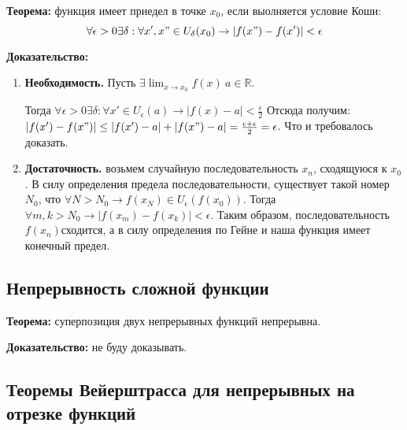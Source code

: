 \documentclass{article}
\begin{document}
\textbf{Теорема:} функция имеет приедел в точке $x_0$, если выолняется условие Коши:
\begin{equation}
    \forall\epsilon>0\exists\delta:\forall x',x" \in U_{\delta}(x_0) \rightarrow |f(x") - f(x')| < \epsilon
\end{equation}

\textbf{Доказательство:}
\begin{enumerate}
    \item \textbf{Необходимость.} Пусть $\exists\lim_{x\rightarrow x_0} f(x) \ a\in\mathbb{R}$.
    
    Тогда $\forall\epsilon>0\exists\delta:\forall x'\in U_{\epsilon}(a) \rightarrow |f(x) - a| < \frac{\epsilon}{2}$
    Отсюда получим: $|f(x') - f(x")| \leq |f(x')-a|+|f(x")-a| = \frac{\epsilon + \epsilon}{2} = \epsilon$.
    Что и требовалось доказать.
    
    \item \textbf{Достаточность.} возьмем случайную последовательность $x_n$, сходящуюся к $x_0$. В силу определения предела последовательности, существует такой номер $N_0$, что $\forall N > N_0 \rightarrow f(x_N)\in U_{\epsilon}(f(x_0))$. Тогда $\forall m, k > N_0 \rightarrow |f(x_m) - f(x_k)| < \epsilon$. Таким образом, последовательность $f(x_n)$сходится, а в силу определения по Гейне и наша функция имеет конечный предел.
    
\end{enumerate}

\subsection{Непрерывность сложной функции}

\noindent{}

\textbf{Теорема:} суперпозиция двух непрерывных функций непрерывна.

\textbf{Доказательство:} не буду доказывать.

\subsection{Теоремы Вейерштрасса для непрерывных на отрезке функций}
\end{document}
